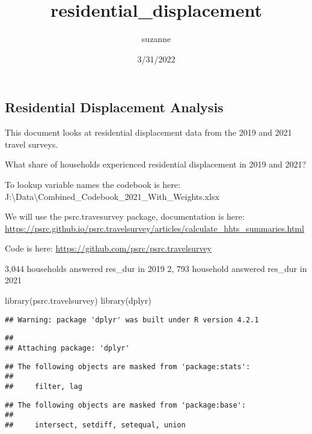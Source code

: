 \documentclass[
]{article}
\title{residential\_displacement}
\author{suzanne}
\date{3/31/2022}
\newenvironment{Shaded}{\begin{snugshade}}{\end{snugshade}}
\newcommand{\FunctionTok}[1]{\textcolor[rgb]{0.00,0.00,0.00}{#1}}
\newcommand{\NormalTok}[1]{#1}
\begin{document}
\maketitle

\hypertarget{residential-displacement-analysis}{%
\subsection{Residential Displacement
Analysis}\label{residential-displacement-analysis}}

This document looks at residential displacement data from the 2019 and
2021 travel surveys.

What share of households experienced residential displacement in 2019
and 2021?

To lookup variable names the codebook is here:
J:\Projects\Surveys\HHTravel{}\textbackslash Data\textbackslash Combined\_Codebook\_2021\_With\_Weights.xlsx

We will use the psrc.travesurvey package, documentation is here:
\url{https://psrc.github.io/psrc.travelsurvey/articles/calculate_hhts_summaries.html}

Code is here: \url{https://github.com/psrc/psrc.travelsurvey}

3,044 households answered res\_dur in 2019 2, 793 household answered
res\_dur in 2021

\begin{Shaded}
\begin{Highlighting}[]
\FunctionTok{library}\NormalTok{(psrc.travelsurvey)}
\FunctionTok{library}\NormalTok{(dplyr)}
\end{Highlighting}
\end{Shaded}

\begin{verbatim}
## Warning: package 'dplyr' was built under R version 4.2.1
\end{verbatim}

\begin{verbatim}
## 
## Attaching package: 'dplyr'
\end{verbatim}

\begin{verbatim}
## The following objects are masked from 'package:stats':
## 
##     filter, lag
\end{verbatim}

\begin{verbatim}
## The following objects are masked from 'package:base':
## 
##     intersect, setdiff, setequal, union
\end{verbatim}
\end{document}
